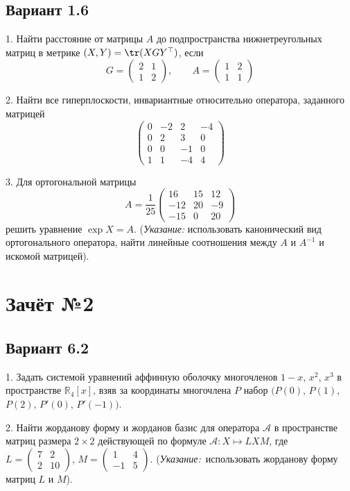 \documentclass[a4paper]{article}
\def\No{№}
\begin{document}
\subsection{Вариант 1.6}

1. Найти расстояние от матрицы $A$ до подпространства
нижнетреугольных матриц в метрике $(X, Y)=\tr (XGY^\top)$, если
$$
G=\left(\begin{array}{rr} 2 & 1\\
1 & 2
\end{array}\right) ,\qquad
A=\left(
\begin{array}{rr} 1 & 2\\
1 & 1
\end{array}\right)
$$

2. Найти все гиперплоскости, инвариантные относительно оператора,
заданного матрицей
$$
\left(
\begin{array}{rrrr}
0 & -2& 2 & -4\\
0 & 2 & 3 & 0\\
0 & 0 & -1 &0 \\
1 & 1 & -4 &4
\end{array}\right )
$$

3. Для ортогональной матрицы
$$
A=\frac{1}{25} \left(
\begin{array}{rrr}
16 & 15 & 12\\
-12 & 20 & -9 \\
-15 & 0 & 20
\end{array}\right)
$$
решить уравнение $\exp X=A$. ({\it Указание:} использовать
канонический вид ортогонального оператора, найти линейные
соотношения между $A$ и $A^{-1}$  и искомой матрицей).

\section{Зачёт \No 2}

\subsection{Вариант 6.2}

1. Задать системой уравнений аффинную оболочку многочленов $1-x$,
$x^2$, $x^3$ в пространстве $\mathbb{R}_4[x]$, взяв за координаты
многочлена $P$ набор $(P(0)$, $P(1)$, $P(2)$, $P'(0)$, $P'(-1))$.

2. Найти жорданову форму и жорданов базис для оператора
$\mathcal{A}$ в пространстве матриц размера $2\times 2$
действующей по формуле $\mathcal{A}: X \longmapsto LXM$, где
$L=\left(\begin{array}{rr} 7 & 2 \\ 2 & 10 \end{array}\right)$,
$M=\left(\begin{array}{rr} 1 & 4 \\ -1 & 5 \end{array}\right)$.
({\it Указание:}\ использовать жорданову форму матриц $L$ и $M$).
\end{document}
